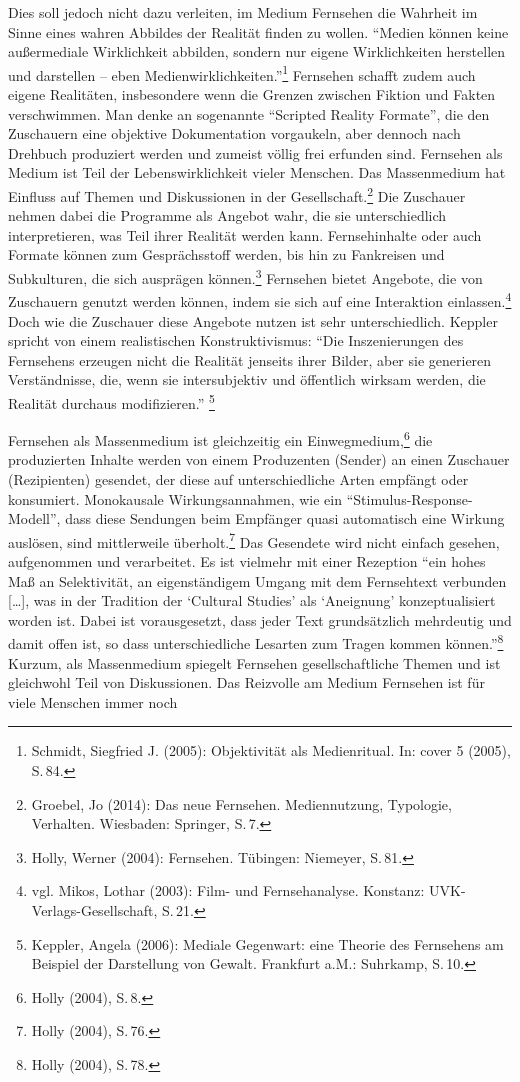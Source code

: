 Dies soll jedoch nicht dazu verleiten, im Medium Fernsehen die Wahrheit
im Sinne eines wahren Abbildes der Realität finden zu wollen.
\enquote{Medien können keine außermediale Wirklichkeit abbilden, sondern
nur eigene Wirklichkeiten herstellen und darstellen -- eben
Medienwirklichkeiten.}\footnote{Schmidt, Siegfried J. (2005):
  Objektivität als Medienritual. In: cover 5 (2005), S.\,84.} Fernsehen
schafft zudem auch eigene Realitäten, insbesondere wenn die Grenzen
zwischen Fiktion und Fakten verschwimmen. Man denke an sogenannte
\enquote{Scripted Reality Formate}, die den Zuschauern eine objektive
Dokumentation vorgaukeln, aber dennoch nach Drehbuch produziert werden
und zumeist völlig frei erfunden sind. Fernsehen als Medium ist Teil der
Lebenswirklichkeit vieler Menschen. Das Massenmedium hat Einfluss auf
Themen und Diskussionen in der Gesellschaft.\footnote{Groebel, Jo
  (2014): Das neue Fernsehen. Mediennutzung, Typologie, Verhalten.
  Wiesbaden: Springer, S.\,7.} Die Zuschauer nehmen dabei die Programme
als Angebot wahr, die sie unterschiedlich interpretieren, was Teil ihrer
Realität werden kann. Fernsehinhalte oder auch Formate können zum
Gesprächsstoff werden, bis hin zu Fankreisen und Subkulturen, die sich
ausprägen können.\footnote{Holly, Werner (2004): Fernsehen. Tübingen:
  Niemeyer, S.\,81.} Fernsehen bietet Angebote, die von Zuschauern genutzt
werden können, indem sie sich auf eine Interaktion einlassen.\footnote{vgl.
  Mikos, Lothar (2003): Film- und Fernsehanalyse. Konstanz:
  UVK-Verlags-Gesellschaft, S.\,21.} Doch wie die Zuschauer diese Angebote
nutzen ist sehr unterschiedlich. Keppler spricht von einem realistischen
Konstruktivismus: \enquote{Die Inszenierungen des Fernsehens erzeugen
nicht die Realität jenseits ihrer Bilder, aber sie generieren
Verständnisse, die, wenn sie intersubjektiv und öffentlich wirksam
werden, die Realität durchaus modifizieren.} \footnote{Keppler, Angela
  (2006): Mediale Gegenwart: eine Theorie des Fernsehens am Beispiel der
  Darstellung von Gewalt. Frankfurt a.M.: Suhrkamp, S.\,10.}

Fernsehen als Massenmedium ist gleichzeitig ein Einwegmedium,\footnote{Holly
  (2004), S.\,8.} die produzierten Inhalte werden von einem Produzenten
(Sender) an einen Zuschauer (Rezipienten) gesendet, der diese auf
unterschiedliche Arten empfängt oder konsumiert. Monokausale
Wirkungsannahmen, wie ein \enquote{Stimulus-Response-Modell}, dass diese
Sendungen beim Empfänger quasi automatisch eine Wirkung auslösen, sind
mittlerweile überholt.\footnote{Holly (2004), S.\,76.} Das Gesendete wird
nicht einfach gesehen, aufgenommen und verarbeitet. Es ist vielmehr mit
einer Rezeption \enquote{ein hohes Maß an Selektivität, an
eigenständigem Umgang mit dem Fernsehtext verbunden {[}\ldots{}{]}, was
in der Tradition der \enquote{Cultural Studies} als \enquote{Aneignung}
konzeptualisiert worden ist. Dabei ist vorausgesetzt, dass jeder Text
grundsätzlich mehrdeutig und damit offen ist, so dass unterschiedliche
Lesarten zum Tragen kommen können.}\footnote{Holly (2004), S.\,78.}
Kurzum, als Massenmedium spiegelt Fernsehen gesellschaftliche Themen und
ist gleichwohl Teil von Diskussionen. Das Reizvolle am Medium Fernsehen
ist für viele Menschen immer noch

